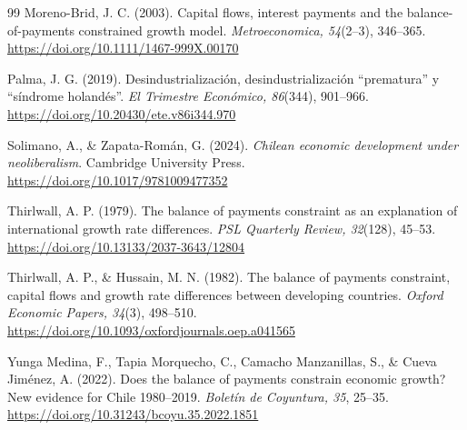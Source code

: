 \documentclass[11pt]{article}
\begin{document}
\begin{thebibliography}{99}
Moreno-Brid, J. C. (2003). Capital flows, interest payments and the balance-of-payments constrained growth model. \textit{Metroeconomica, 54}(2--3), 346--365.
\url{https://doi.org/10.1111/1467-999X.00170}

Palma, J. G. (2019). Desindustrialización, desindustrialización ``prematura'' y ``síndrome holandés''. \textit{El Trimestre Económico, 86}(344), 901--966.
\url{https://doi.org/10.20430/ete.v86i344.970}

Solimano, A., \& Zapata-Román, G. (2024). \textit{Chilean economic development under neoliberalism}. Cambridge University Press.
\url{https://doi.org/10.1017/9781009477352}

Thirlwall, A. P. (1979). The balance of payments constraint as an explanation of international growth rate differences. \textit{PSL Quarterly Review, 32}(128), 45--53.
\url{https://doi.org/10.13133/2037-3643/12804}

Thirlwall, A. P., \& Hussain, M. N. (1982). The balance of payments constraint, capital flows and growth rate differences between developing countries. \textit{Oxford Economic Papers, 34}(3), 498--510.
\url{https://doi.org/10.1093/oxfordjournals.oep.a041565}

Yunga Medina, F., Tapia Morquecho, C., Camacho Manzanillas, S., \& Cueva Jiménez, A. (2022). Does the balance of payments constrain economic growth? New evidence for Chile 1980--2019. \textit{Boletín de Coyuntura, 35}, 25--35.
\url{https://doi.org/10.31243/bcoyu.35.2022.1851}

\end{thebibliography}
\end{document}
